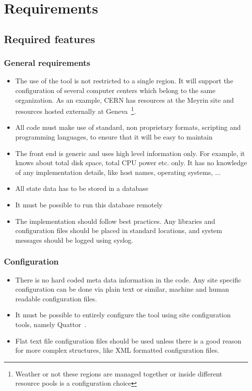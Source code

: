 \documentclass[12pt]{article}
\begin{document}
\section{Requirements}
\subsection{Required features}

\subsubsection{General requirements}
\begin{itemize}
\item The use of the tool is not restricted to a single region. It will support the configuration of several computer 
centers which belong to the same organization. As an example, CERN has resources at the Meyrin site and resources hosted externally at Geneva~\footnote{Weather or not these regions are managed together or inside different resource pools is a configuration choice}.
\item All code must make use of standard, non proprietary formats, scripting and programming languages, to ensure that it will be easy to maintain
\item The front end is generic and uses high level information only. For example, it knows about total disk space, total CPU power etc. only. It has no knowledge of any implementation details, like host names, operating systems, ...
\item All state data has to be stored in a database
\item It must be possible to run this database remotely
\item The implementation should follow best practices. Any libraries and configuration files should be placed in standard locations, and system messages should be logged using syslog. 
\end{itemize}


\subsubsection{Configuration}
\begin{itemize}
\item There is no hard coded meta data information in the code. Any site specific configuration can be done via plain text or similar, machine and human readable configuration files.
\item It must be possible to entirely configure the tool using site configuration tools, namely Quattor~\cite{quattor}.
\item Flat text file configuration files should be used unless there is a good reason for more complex structures, like XML formatted configuration files. 
\end{itemize}
\end{document}
